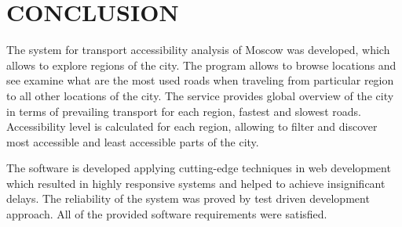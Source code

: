 \section{CONCLUSION}

The system for transport accessibility analysis of Moscow was developed, which allows to explore
regions of the city. The program allows to browse locations and see examine what are the most
used roads when traveling from particular region to all other locations of the city. The service
provides global overview of the city in terms of prevailing transport for each region, fastest
and slowest roads. Accessibility level is calculated for each region, allowing to filter and
discover most accessible and least accessible parts of the city.

The software is developed applying cutting-edge techniques in web development which resulted
in highly responsive systems and helped to achieve insignificant delays. The reliability of the
system was proved by test driven development approach. All of the provided software requirements
were satisfied.